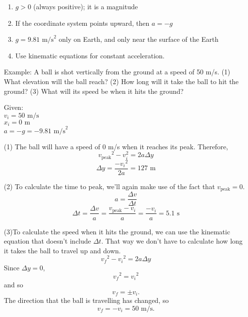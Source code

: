 \begin{enumerate}
\item $g>0$ (always positive); it is a magnitude
\item If the coordinate system points upward, then $a=-g$
\item $g=9.81\mbox{ m/s}^2$ only on Earth, and only near the surface of the Earth
\item Use kinematic equations for constant acceleration.
\end{enumerate}

Example:
A ball is shot vertically from the ground at a speed of 50 m/s. (1) What elevation will the ball reach? (2) How long will it take the ball to hit the ground? (3) What will its speed be when it hits the ground?

Given:\\
$v_i=50\mbox{ m/s}$\\
$x_i=0\mbox{ m}$\\
$a=-g=-9.81\mbox{ m/s}^2$

(1) The ball will have a speed of 0 m/s when it reaches its peak. Therefore,
$$v_{\mbox{peak}}\displaystyle^2-v_i^2=2a\Delta{y}$$
$$\Delta{y}=\frac{-v_i\displaystyle^2}{2a}=127\mbox{ m}$$

(2) To calculate the time to peak, we'll again make use of the fact that $v_{\mbox{peak}}=0$.
$$a=\frac{\Delta{v}}{\Delta{t}}$$
$$\Delta{t}=\frac{\Delta{v}}{a}=\frac{v_{\mbox{peak}}-v_i}{a}=\frac{-v_i}{a}=5.1\mbox{ s}$$

(3)To calculate the speed when it hits the ground, we can use the kinematic equation that doesn't include $\Delta{t}$. That way we don't have to calculate how long it takes the ball to travel up and down.
$$v_f\displaystyle^2-v_i\displaystyle^2=2a\Delta{y}$$
Since $\Delta{y}=0$,
$$v_f\displaystyle^2=v_i\displaystyle^2$$
and so
$$v_f=\pm v_i.$$
The direction that the ball is travelling has changed, so 
$$v_f=-v_i=50\mbox{ m/s}.$$

\clearpage

